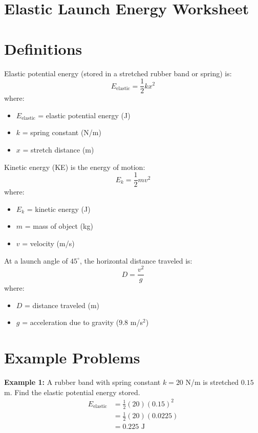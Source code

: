 \documentclass{article}
\begin{document}
\section{Elastic Launch Energy Worksheet}

\section{Definitions}

Elastic potential energy (stored in a stretched rubber band or spring) is:
\begin{equation}
    E_{\text{elastic}} = \frac{1}{2}kx^2
\end{equation}
where:
\begin{itemize}
    \item $E_{\text{elastic}}$ = elastic potential energy (J)
    \item $k$ = spring constant (N/m)
    \item $x$ = stretch distance (m)
\end{itemize}

Kinetic energy (KE) is the energy of motion:
\begin{equation}
    E_k = \frac{1}{2}mv^2
\end{equation}
where:
\begin{itemize}
    \item $E_k$ = kinetic energy (J)
    \item $m$ = mass of object (kg)
    \item $v$ = velocity (m/s)
\end{itemize}

At a launch angle of $45^\circ$, the horizontal distance traveled is:
\begin{equation}
    D = \frac{v^2}{g}
\end{equation}
where:
\begin{itemize}
    \item $D$ = distance traveled (m)
    \item $g$ = acceleration due to gravity ($9.8$ m/s$^2$)
\end{itemize}

\section{Example Problems}

\textbf{Example 1:}  
A rubber band with spring constant $k = 20$ N/m is stretched $0.15$ m.  
Find the elastic potential energy stored.
\begin{align*}
    E_{\text{elastic}} &= \frac{1}{2}(20)(0.15)^2 \\
                       &= \frac{1}{2}(20)(0.0225) \\
                       &= 0.225 \text{ J}
\end{align*}
\end{document}
